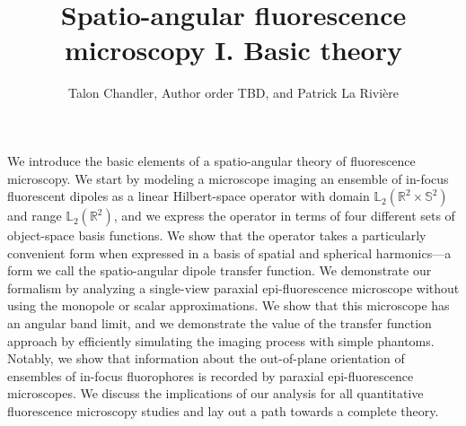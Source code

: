 \documentclass[]{osa-article}
\providecommand{\mbb}[1]{\mathbb{#1}}
\begin{document}
\title{Spatio-angular fluorescence microscopy I. Basic theory}

\author{Talon Chandler, Author order TBD, and Patrick La Rivi\`ere }

\address{University of Chicago, Department of Radiology, Chicago, Illinois 60637, USA\\
Publications Department, The Optical Society, 2010 Massachusetts Avenue NW, Washington, DC 20036, USA\\
Currently with the Department of Electronic Journals, The Optical Society, 2010 Massachusetts Avenue NW, Washington, DC 20036, USA}




\begin{abstract*}
  We introduce the basic elements of a spatio-angular theory of fluorescence
  microscopy. We start by modeling a microscope imaging an ensemble of in-focus
  fluorescent dipoles as a linear Hilbert-space operator with domain
  $\mbb{L}_2(\mbb{R}^2\times\mbb{S}^2)$ and range $\mbb{L}_2(\mbb{R}^2)$, and we
  express the operator in terms of four different sets of object-space basis
  functions. We show that the operator takes a particularly convenient form when
  expressed in a basis of spatial and spherical harmonics---a form we call the
  spatio-angular dipole transfer function. We demonstrate our formalism by
  analyzing a single-view paraxial epi-fluorescence microscope without using the
  monopole or scalar approximations. We show that this microscope has an angular
  band limit, and we demonstrate the value of the transfer function approach by
  efficiently simulating the imaging process with simple phantoms. Notably, we
  show that information about the out-of-plane orientation of ensembles of
  in-focus fluorophores is recorded by paraxial epi-fluorescence microscopes. We
  discuss the implications of our analysis for all quantitative fluorescence
  microscopy studies and lay out a path towards a complete theory.
\end{abstract*}
\end{document}
